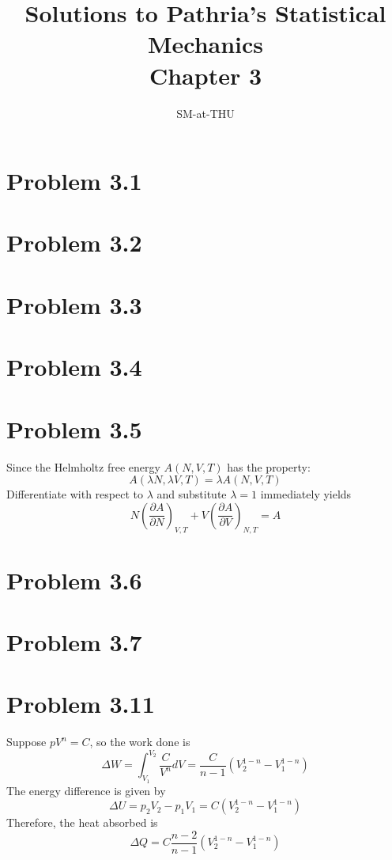 \documentclass{article}
\author{SM-at-THU}
\title{\bf{Solutions to Pathria's Statistical Mechanics}\\Chapter 3}
\begin{document}
\maketitle

\section*{Problem 3.1}

\section*{Problem 3.2}

\section*{Problem 3.3}

\section*{Problem 3.4}

\section*{Problem 3.5}
	Since the Helmholtz free energy $A(N,V,T)$ has the property:
	\begin{equation*}
		A(\lambda N,\lambda V,T) = \lambda A(N,V,T)
	\end{equation*}
	Differentiate with respect to $\lambda$ and substitute $\lambda=1$ immediately yields
	\begin{equation*}
		N\left( \frac{ \partial A }{\partial N} \right)_{V,T}+V \left( \frac{ \partial A }{\partial V} \right)_{N,T} = A
	\end{equation*}

\section*{Problem 3.6}

\section*{Problem 3.7}

\section*{Problem 3.11}
Suppose $pV^{n} = C$, so the work done is
\begin{equation}
\Delta W = \int^{V_{2}}_{V_{1}} \frac{C}{V^{n}} dV = \frac{C}{n-1} (V^{1-n}_{2} - V^{1-n}_{1})
\end{equation}
The energy difference is given by
\begin{equation}
\Delta U = p_{2}V_{2} - p_{1}V_{1} = C (V^{1-n}_{2} - V^{1-n}_{1})
\end{equation}
Therefore, the heat absorbed is
\begin{equation}
\Delta Q =  C\frac{n-2}{n-1} (V^{1-n}_{2} - V^{1-n}_{1})
\end{equation}
\end{document}
